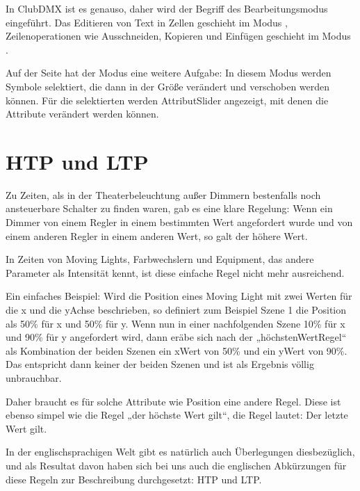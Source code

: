 \documentclass[letterpaper,10pt,ngerman]{sphinxmanual}
\begin{document}
In ClubDMX ist es genauso, daher wird der Begriff des Bearbeitungsmodus
eingeführt. Das Editieren von Text in Zellen geschieht im Modus ,
Zeilenoperationen wie Ausschneiden, Kopieren und Einfügen geschieht im
Modus .

Auf der \sphinxhyphen{}Seite hat der Modus  eine weitere Aufgabe:
In diesem Modus werden Symbole selektiert,
die dann in der Größe verändert und verschoben
werden können. Für die selektierten  werden Attribut\sphinxhyphen{}Slider
angezeigt, mit denen die Attribute verändert werden können.


\section{HTP und LTP}
\label{\detokenize{grundlagen:htp-und-ltp}}\label{\detokenize{grundlagen:htpltplabel}}
Zu Zeiten, als in der Theaterbeleuchtung außer Dimmern bestenfalls noch
ansteuerbare Schalter zu finden waren, gab es eine klare Regelung: Wenn
ein Dimmer von einem Regler in einem bestimmten Wert angefordert wurde
und von einem anderen Regler in einem anderen Wert, so galt der höhere Wert.

In Zeiten von Moving Lights, Farbwechslern und Equipment, das andere
Parameter als Intensität kennt, ist diese einfache Regel nicht mehr ausreichend.

Ein einfaches Beispiel: Wird die Position eines Moving Light mit zwei Werten
für die
x\sphinxhyphen{} und die y\sphinxhyphen{}Achse beschrieben, so definiert zum Beispiel Szene 1 die Position
als 50\% für x und 50\% für y. Wenn nun in einer nachfolgenden Szene 10\% für x und
90\% für y angefordert wird, dann eräbe sich nach der „höchsten\sphinxhyphen{}Wert\sphinxhyphen{}Regel“ als
Kombination der beiden Szenen ein x\sphinxhyphen{}Wert von 50\% und ein y\sphinxhyphen{}Wert von 90\%. Das
entspricht dann keiner der beiden Szenen und ist als Ergebnis völlig
unbrauchbar.

Daher braucht es für solche Attribute wie Position eine andere Regel. Diese
ist ebenso simpel wie die Regel „der höchste Wert gilt“, die Regel lautet:
Der letzte Wert gilt.

In der englischsprachigen Welt gibt es natürlich auch Überlegungen
diesbezüglich, und als Resultat davon haben sich bei uns auch die
englischen Abkürzungen für diese Regeln zur Beschreibung durchgesetzt:
HTP und LTP.
\end{document}
